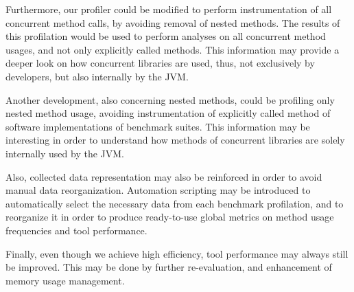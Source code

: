 \documentclass[]{usiinfthesis}
\begin{document}
Furthermore, our profiler could be modified to perform instrumentation of all concurrent method calls, by avoiding removal of nested methods. The results of this profilation would be used to perform analyses on all concurrent method usages, and not only explicitly called methods. This information may provide a deeper look on how concurrent libraries are used, thus, not exclusively by developers, but also internally by the JVM.

Another development, also concerning nested methods, could be profiling only nested method usage, avoiding instrumentation of explicitly called method of software implementations of benchmark suites. This information may be interesting in order to understand how methods of concurrent libraries are solely internally used by the JVM.

Also, collected data representation may also be reinforced in order to avoid manual data reorganization. Automation scripting may be introduced to automatically select the necessary data from each benchmark profilation, and to reorganize it in order to produce ready-to-use global metrics on method usage frequencies and tool performance.

Finally, even though we achieve high efficiency, tool performance may always still be improved. This may be done by further re-evaluation, and enhancement of memory usage management. 

\backmatter
\end{document}
